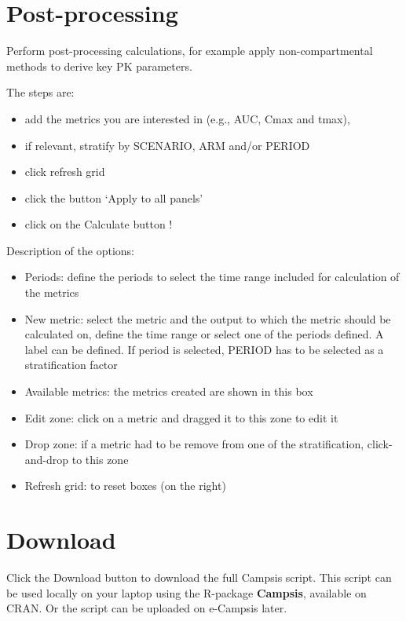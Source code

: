 \documentclass[
]{book}
\providecommand{\tightlist}{%
  \setlength{\itemsep}{0pt}\setlength{\parskip}{0pt}}
\begin{document}
\hypertarget{post-processing}{%
\chapter{Post-processing}\label{post-processing}}

Perform post-processing calculations, for example apply non-compartmental methods to derive key PK parameters.

The steps are:

\begin{itemize}
\tightlist
\item
  add the metrics you are interested in (e.g., AUC, Cmax and tmax),
\item
  if relevant, stratify by SCENARIO, ARM and/or PERIOD
\item
  click refresh grid
\item
  click the button `Apply to all panels'
\item
  click on the Calculate button !
\end{itemize}

Description of the options:

\begin{itemize}
\tightlist
\item
  Periods: define the periods to select the time range included for calculation of the metrics
\item
  New metric: select the metric and the output to which the metric should be calculated on, define the time range or select one of the periods defined. A label can be defined. If period is selected, PERIOD has to be selected as a stratification factor
\item
  Available metrics: the metrics created are shown in this box
\item
  Edit zone: click on a metric and dragged it to this zone to edit it
\item
  Drop zone: if a metric had to be remove from one of the stratification, click-and-drop to this zone
\item
  Refresh grid: to reset boxes (on the right)
\end{itemize}

\hypertarget{download}{%
\chapter{Download}\label{download}}

Click the Download button to download the full Campsis script. This script can be used locally on your laptop using the R-package \textbf{Campsis}, available on CRAN. Or the script can be uploaded on e-Campsis later.
\end{document}
